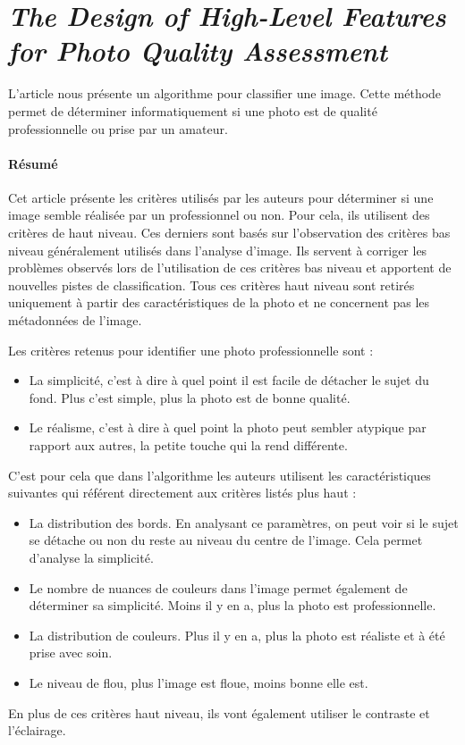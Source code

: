 \documentclass[11pt, french]{report-rd-info}
\begin{document}
\section{\emph{The Design of High-Level Features for Photo Quality Assessment}}
L'article \cite{Ke} nous présente un algorithme pour classifier une image. Cette méthode permet de déterminer informatiquement si une photo est de qualité professionnelle ou prise par un amateur.

\paragraph{Résumé}
Cet article présente les critères utilisés par les auteurs pour déterminer si une image semble réalisée par un professionnel ou non. Pour cela, ils utilisent des critères de haut niveau. Ces derniers sont basés sur l'observation des critères bas niveau généralement utilisés dans l'analyse d'image. Ils servent à corriger les problèmes observés lors de l'utilisation de ces critères bas niveau et apportent de nouvelles pistes de classification.
Tous ces critères haut niveau sont retirés uniquement à partir des caractéristiques de la photo et ne concernent pas les métadonnées de l'image.

Les critères retenus pour identifier une photo professionnelle sont :
\begin{itemize}
\item La simplicité, c'est à dire à quel point il est facile de détacher le sujet du fond. Plus c'est simple, plus la photo est de bonne qualité.
\item Le réalisme, c'est à dire à quel point la photo peut sembler atypique par rapport aux autres, la petite touche qui la rend différente.
\end{itemize}
C'est pour cela que dans l'algorithme les auteurs utilisent les caractéristiques suivantes qui référent directement aux critères listés plus haut :
\begin{itemize}
\item La distribution des bords. En analysant ce paramètres, on peut voir si le sujet se détache ou non du reste au niveau du centre de l'image. Cela permet d'analyse la simplicité.
\item Le nombre de nuances de couleurs dans l'image permet également de déterminer sa simplicité. Moins il y en a, plus la photo est professionnelle.
\item La distribution de couleurs. Plus il y en a, plus la photo est réaliste et à été prise avec soin.
\item Le niveau de flou, plus l'image est floue, moins bonne elle est.
\end{itemize}
En plus de ces critères haut niveau, ils vont également utiliser le contraste et l'éclairage.
\end{document}
